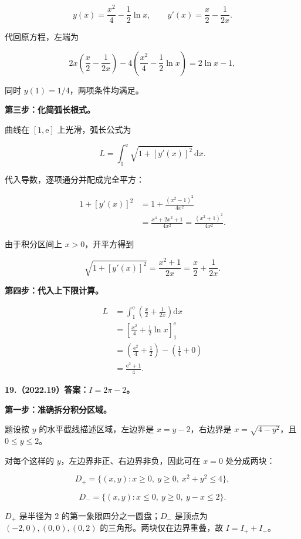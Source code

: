 \documentclass[UTF8,11pt,fontset=windows]{ctexart}
\begin{document}
$$
\boxed{y(x)=\frac{x^2}{4}-\frac12\ln x},
\qquad y'(x)=\frac x2-\frac1{2x}.
$$

代回原方程，左端为

$$
2x\left(\frac x2-\frac1{2x}\right)
-4\left(\frac{x^2}{4}-\frac12\ln x\right)
=2\ln x-1,
$$

同时 $y(1)=1/4$，两项条件均满足。

\textbf{第三步：化简弧长根式。}

曲线在 $[1,\mathrm e]$ 上光滑，弧长公式为

$$
L=\int_1^{\mathrm e}\sqrt{1+[y'(x)]^2}\,\mathrm dx.
$$

代入导数，逐项通分并配成完全平方：

$$
\begin{aligned}
1+[y'(x)]^2
&=1+\frac{(x^2-1)^2}{4x^2}\\
&=\frac{x^4+2x^2+1}{4x^2}
=\frac{(x^2+1)^2}{4x^2}.
\end{aligned}
$$

由于积分区间上 $x>0$，开平方得到

$$
\sqrt{1+[y'(x)]^2}
=\frac{x^2+1}{2x}=\frac x2+\frac1{2x}.
$$

\textbf{第四步：代入上下限计算。}

$$
\begin{aligned}
L&=\int_1^{\mathrm e}\left(\frac x2+\frac1{2x}\right)\mathrm dx\\
&=\left[\frac{x^2}{4}+\frac12\ln x\right]_1^{\mathrm e}\\
&=\left(\frac{\mathrm e^2}{4}+\frac12\right)-\left(\frac14+0\right)\\
&=\boxed{\frac{\mathrm e^2+1}{4}}.
\end{aligned}
$$

\clearpage

\textbf{19.（2022.19）答案：$I=2\pi-2$。}

\textbf{第一步：准确拆分积分区域。}

题设按 $y$ 的水平截线描述区域，左边界是 $x=y-2$，右边界是 $x=\sqrt{4-y^2}$，且 $0\le y\le2$。

对每个这样的 $y$，左边界非正、右边界非负，因此可在 $x=0$ 处分成两块：

$$
D_+=\{(x,y):x\ge0,\ y\ge0,\ x^2+y^2\le4\},
$$

$$
D_-=\{(x,y):x\le0,\ y\ge0,\ y-x\le2\}.
$$

$D_+$ 是半径为 $2$ 的第一象限四分之一圆盘；$D_-$ 是顶点为 $(-2,0),(0,0),(0,2)$ 的三角形。两块仅在边界重叠，故 $I=I_++I_-$。
\end{document}
